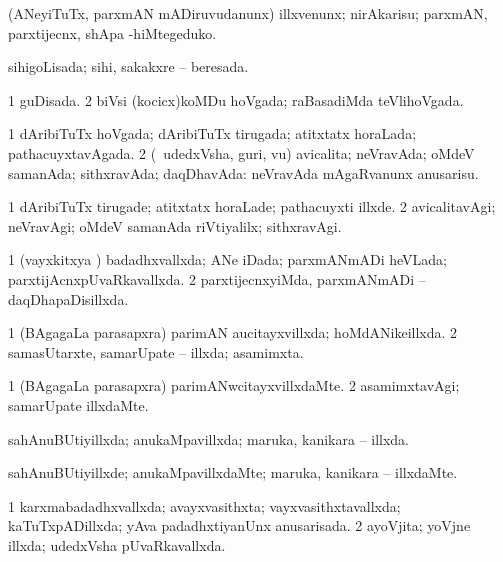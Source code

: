 {{\bentry
{} 
\gl{\sakirx}
\expl{}
\bmng
(ANeyiTuTx, parxmAN mADiruvudanunx) illxvenunx; nirAkarisu; parxmAN, parxtijecnx, shApa -hiMtegeduko. 
\emng
\eentry

\bentry
{} 
\gl{\gu}
\expl{}
\bmng
sihigoLisada; sihi, sakakxre -- beresada. 
\emng
\eentry

\bentry
{} 
\gl{\gu}
\expl{}
\bmng
\bnum
\num{1} guDisada. 
\num{2} biVsi (kocicx)koMDu hoVgada; raBasadiMda teVlihoVgada. 
\enum
\emng
\eentry

\bentry
{} 
\gl{\gu}
\expl{}
\bmng
\bnum
\num{1} dAribiTuTx hoVgada; dAribiTuTx tirugada; atitxtatx horaLada; pathacuyxtavAgada. 
\num{2} (\kanmu\ udedxVsha, guri, \mo vu) avicalita; neVravAda; oMdeV samanAda; sithxravAda; daqDhavAda:  neVravAda mAgaRvanunx anusarisu. 
\enum
\emng
\eentry

\bentry
{} 
\gl{\kirxvi}
\expl{}
\bmng
\bnum
\num{1} dAribiTuTx tirugade; atitxtatx horaLade; pathacuyxti illxde. 
\num{2} avicalitavAgi; neVravAgi; oMdeV samanAda riVtiyalilx; sithxravAgi. 
\enum
\emng
\eentry

\bentry
{} 
\gl{\gu}
\expl{}
\bmng
\bnum
\num{1} (vayxkitxya \vi) badadhxvallxda; ANe iDada; parxmANmADi heVLada; parxtijAcnxpUvaRkavallxda. 
\num{2} parxtijecnxyiMda, parxmANmADi -- daqDhapaDisillxda. 
\enum
\emng
\eentry

\bentry
{} 
\gl{\gu}
\expl{}
\bmng
\bnum
\num{1} (BAgagaLa parasapxra) parimAN aucitayxvillxda; hoMdANikeillxda. 
\num{2} samasUtarxte, samarUpate -- illxda; asamimxta. 
\enum
\emng
\eentry

\bentry
{} 
\gl{\kirxvi}
\expl{}
\bmng
\bnum
\num{1} (BAgagaLa parasapxra) parimANwcitayxvillxdaMte. 
\num{2} asamimxtavAgi; samarUpate illxdaMte. 
\enum
\emng
\eentry

\bentry
{} 
\gl{\gu}
\expl{}
\bmng
sahAnuBUtiyillxda; anukaMpavillxda; maruka, kanikara -- illxda. 
\emng
\eentry

\bentry
{} 
\gl{\kirxvi}
\expl{}
\bmng
sahAnuBUtiyillxde; anukaMpavillxdaMte; maruka, kanikara -- illxdaMte. 
\emng
\eentry

\bentry
{} 
\gl{\gu}
\expl{}
\bmng
\bnum
\num{1} karxmabadadhxvallxda; avayxvasithxta; vayxvasithxtavallxda; kaTuTxpADillxda; yAva padadhxtiyanUnx anusarisada. 
\num{2} ayoVjita; yoVjne illxda; udedxVsha pUvaRkavallxda. 
\enum
\emng
\eentry

}}

